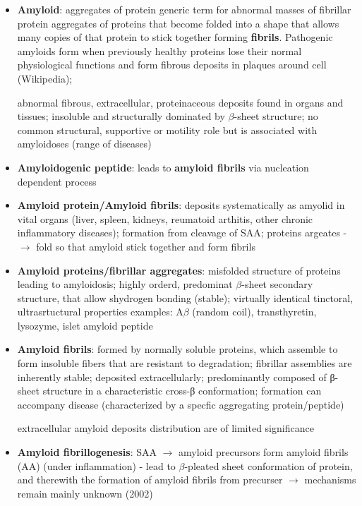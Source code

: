 \documentclass[fleqn]{article}\usepackage{caption}
\begin{document}
\begin{itemize}
\item \textbf{Amyloid}: aggregates of protein %
generic term for abnormal masses of fibrillar protein %
aggregates of proteins that become folded into a shape that allows many copies of that protein to stick together forming \textbf{fibrils}. Pathogenic amyloids form when previously healthy proteins lose their normal physiological functions and form fibrous deposits in plaques around cell (Wikipedia); 

abnormal fibrous, extracellular, proteinaceous deposits found in organs and tissues; insoluble and structurally dominated by $\beta$-sheet structure; no common structural, supportive or motility role but is associated with amyloidoses (range of diseases)%

\item \textbf{Amyloidogenic peptide}: leads to \textbf{amyloid fibrils} via nucleation dependent process

\item \textbf{Amyloid protein/Amyloid fibrils}: deposits systematically as amyolid in vital organs (liver, spleen, kidneys, reumatoid arthitis, other chronic inflammatory diseases); formation from  cleavage of SAA; proteins argeates -$\rightarrow$ fold so that amyloid  stick together and form fibrils %
\item \textbf{Amyloid proteins/fibrillar aggregates}: misfolded structure of proteins leading to amyloidosis; highly orderd, predominat $\beta$-sheet secondary structure, that allow shydrogen bonding (stable); virtually identical tinctoral, ultrasrtuctural properties examples: A$\beta$ (random coil), transthyretin, lysozyme, islet amyloid peptide  %
\item \textbf{Amyloid fibrils}: formed by normally soluble proteins, which assemble to form insoluble fibers that are resistant to degradation; fibrillar assemblies are inherently stable; deposited extracellularly; predominantly composed of β-sheet structure in a characteristic cross-β conformation; formation can accompany disease (characterized by a specfic aggregating protein/peptide) %

extracellular amyloid deposits distribution are of limited significance  %


\item \textbf{Amyloid fibrillogenesis}: SAA $\rightarrow$ amyloid precursors form amyloid fibrils (AA) (under inflammation) - lead to $\beta$-pleated sheet conformation of protein, and therewith the formation of amyloid fibrils from precurser $\rightarrow$ mechanisms remain mainly unknown (2002) %


\end{itemize}
\end{document}
